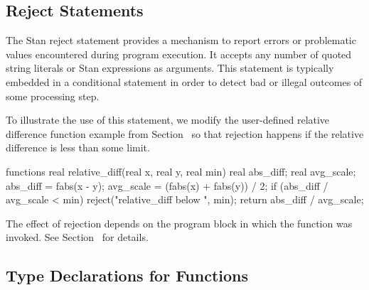 \subsection{Reject Statements}

The Stan reject statement provides a mechanism to report errors or problematic
values encountered during program execution.
It accepts any number of quoted string literals or Stan expressions as arguments.
This statement is typically embedded in a conditional statement in order to
detect bad or illegal outcomes of some processing step.

To illustrate the use of this statement, we modify the user-defined
relative difference function example from Section~
so that rejection happens if the relative difference is less than
some limit.
%
\begin{stancode}
functions {
  real relative_diff(real x, real y, real min) {
    real abs_diff;
    real avg_scale;
    abs_diff = fabs(x - y);
    avg_scale = (fabs(x) + fabs(y)) / 2;
    if (abs_diff / avg_scale < min) 
      reject("relative_diff below ", min);
    return abs_diff / avg_scale;
  }
}
\end{stancode}

The effect of rejection depends on the program block
in which the function was invoked.
See Section~ for details.

\subsection{Type Declarations for Functions}

